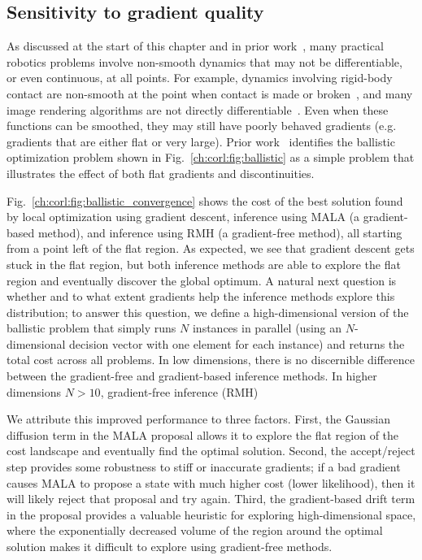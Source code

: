 \subsection{Sensitivity to gradient quality}

As discussed at the start of this chapter and in prior work~\cite{suhDifferentiableSimulatorsGive2022,suh2021_bundled_gradients}, many practical robotics problems involve non-smooth dynamics that may not be differentiable, or even continuous, at all points. For example, dynamics involving rigid-body contact are non-smooth at the point when contact is made or broken~\cite{suhDifferentiableSimulatorsGive2022}, and many image rendering algorithms are not directly differentiable~\cite{zhaoPhysicsbasedDifferentiableRendering2020}. Even when these functions can be smoothed, they may still have poorly behaved gradients (e.g. gradients that are either flat or very large). Prior work~\cite{suhDifferentiableSimulatorsGive2022} identifies the ballistic optimization problem shown in Fig.~\ref{ch:corl:fig:ballistic} as a simple problem that illustrates the effect of both flat gradients and discontinuities.

Fig.~\ref{ch:corl:fig:ballistic_convergence} shows the cost of the best solution found by local optimization using gradient descent, inference using MALA (a gradient-based method), and inference using RMH (a gradient-free method), all starting from a point left of the flat region. As expected, we see that gradient descent gets stuck in the flat region, but both inference methods are able to explore the flat region and eventually discover the global optimum. A natural next question is whether and to what extent gradients help the inference methods explore this distribution; to answer this question, we define a high-dimensional version of the ballistic problem that simply runs $N$ instances in parallel (using an $N$-dimensional decision vector with one element for each instance) and returns the total cost across all problems. In low dimensions, there is no discernible difference between the gradient-free and gradient-based inference methods. In higher dimensions $N > 10$, gradient-free inference (RMH) 

We attribute this improved performance to three factors. First, the Gaussian diffusion term in the MALA proposal allows it to explore the flat region of the cost landscape and eventually find the optimal solution. Second, the accept/reject step provides some robustness to stiff or inaccurate gradients; if a bad gradient causes MALA to propose a state with much higher cost (lower likelihood), then it will likely reject that proposal and try again. Third, the gradient-based drift term in the proposal provides a valuable heuristic for exploring high-dimensional space, where the exponentially decreased volume of the region around the optimal solution makes it difficult to explore using gradient-free methods.

